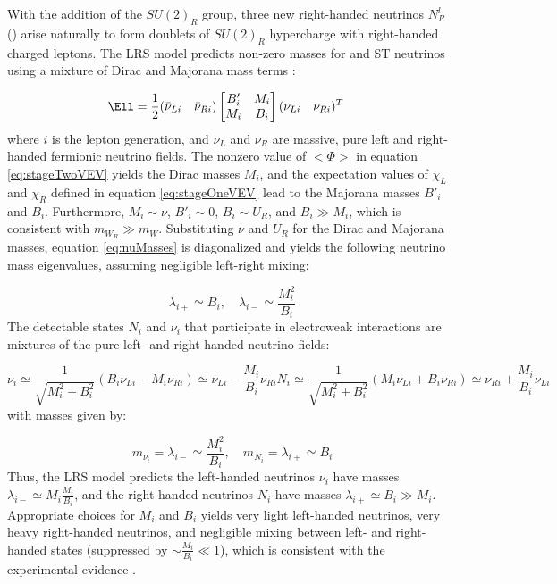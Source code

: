 With the addition of the $SU(2)_{R}$ group, three new right-handed neutrinos $N^{l}_{R}$ (\nul) arise naturally 
to form doublets of $SU(2)_{R}$ hypercharge with right-handed charged leptons.  The LRS model 
predicts non-zero masses for \nul and ST neutrinos using a mixture of Dirac and Majorana mass terms \cite{seeSawAndParityViolation,seeSawAndGUTs}:

\begin{align}
	\Ell &= \frac{1}{2}(\bar{\nu}_{Li} \quad \bar{\nu}_{Ri})\begin{bmatrix}
	B'_{i} & M_{i} \\
	M_{i} & B_{i}
\end{bmatrix}(\nu_{Li} \quad \nu_{Ri})^{T}
\label{eq:nuMasses}
\end{align}
where $i$ is the lepton generation, and $\nu_{L}$ and $\nu_{R}$ are massive, pure left and right-handed 
fermionic neutrino fields.  The nonzero value of $<\Phi>$ in equation \ref{eq:stageTwoVEV} yields the 
Dirac masses $M_{i}$, and the expectation values of $\chi_{L}$ and $\chi_{R}$ defined in equation \ref{eq:stageOneVEV} 
lead to the Majorana masses $B'_{i}$ and $B_{i}$.  Furthermore, $M_{i} \sim \nu$, $B'_{i} \sim 0$, 
$B_{i} \sim U_{R}$, and $B_{i} \gg M_{i}$, which is consistent with $m_{W_{R}} \gg m_{W}$.  Substituting 
$\nu$ and $U_{R}$ for the Dirac and Majorana masses, equation \ref{eq:nuMasses} is diagonalized and yields 
the following neutrino mass eigenvalues, assuming negligible left-right mixing:

\begin{equation}
	\lambda_{i+} \simeq B_{i},  \quad \lambda_{i-} \simeq \frac{M^{2}_{i}}{B_{i}}
\end{equation}
The detectable states $N_{i}$ and $\nu_{i}$ that participate in electroweak interactions are mixtures of the pure 
left- and right-handed neutrino fields:

\begin{equation}
	\nu_{i} \simeq \frac{1}{\sqrt{M^{2}_{i} + B^{2}_{i}}}(B_{i}\nu_{Li} - M_{i}\nu_{Ri}) \simeq \nu_{Li} - \frac{M_{i}}{B_{i}}\nu_{Ri}
	
	N_{i} \simeq \frac{1}{\sqrt{M^{2}_{i} + B^{2}_{i}}}(M_{i}\nu_{Li} + B_{i}\nu_{Ri}) \simeq \nu_{Ri} + \frac{M_{i}}{B_{i}}\nu_{Li}
\end{equation}
with masses given by:

\begin{equation}
	m_{\nu_{i}} = \lambda_{i-} \simeq \frac{M^{2}_{i}}{B_{i}} , \quad m_{N_{i}} = \lambda_{i+} \simeq B_{i}
\end{equation}
Thus, the LRS model predicts the left-handed neutrinos $\nu_{i}$ have masses $\lambda_{i-} \simeq M_{i}\frac{M_{i}}{B_{i}}$, 
and the right-handed neutrinos $N_{i}$ have masses $\lambda_{i+} \simeq B_{i} \gg M_{i}$.  Appropriate choices 
for $M_{i}$ and $B_{i}$ yields very light left-handed neutrinos, very heavy right-handed neutrinos, 
and negligible mixing between left- and right-handed states (suppressed by $\sim \frac{M_{i}}{B_{i}} \ll 1$), 
which is consistent with the experimental evidence \cite{dZeroMixingLimits,theoreticalMixingLimits}.


